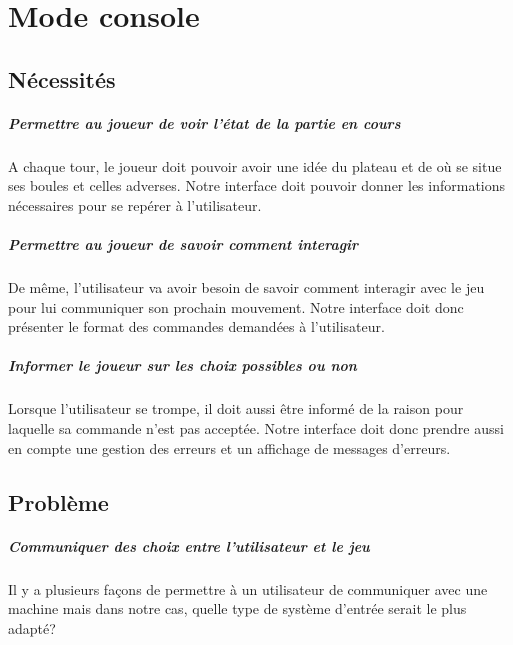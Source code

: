 \documentclass{scrreprt}
\begin{document}
	\chapter{Mode console}
		\section{Nécessités}
			\paragraph{Permettre au joueur de voir l'état de la partie en cours}
			
			A chaque tour, le joueur doit pouvoir avoir une idée du plateau et de où se situe ses boules et celles adverses. Notre interface doit pouvoir donner les informations nécessaires pour se repérer à l'utilisateur.
			
			\paragraph{Permettre au joueur de savoir comment interagir} 
			
			De même, l'utilisateur va avoir besoin de savoir comment interagir avec le jeu pour lui communiquer son prochain mouvement. Notre interface doit donc présenter le format des commandes demandées à l'utilisateur.
			
			\paragraph{Informer le joueur sur les choix possibles ou non}
			
			Lorsque l'utilisateur se trompe, il doit aussi être informé de la raison pour laquelle sa commande n'est pas acceptée. Notre interface doit donc prendre aussi en compte une gestion des erreurs et un affichage de messages d'erreurs.
			
		\section{Problème}
			
			\paragraph{Communiquer des choix entre l'utilisateur et le jeu}
			
			Il y a plusieurs façons de permettre à un utilisateur de communiquer avec une machine mais dans notre cas, quelle type de système d'entrée serait le plus adapté?
			
\end{document}
